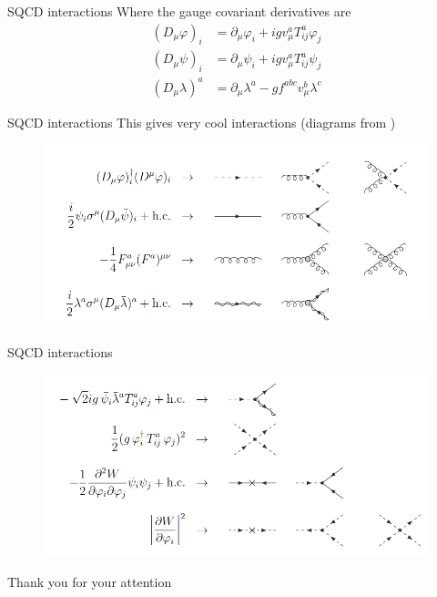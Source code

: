 \documentclass[10pt]{beamer}
\begin{document}
\begin{frame}{SQCD interactions}
    Where the gauge covariant derivatives are
    \begin{equation*}\begin{aligned}
        \left(D_{\mu} \varphi\right)_{i} &=\partial_{\mu} \varphi_{i}+i g v_{\mu}^{a} T_{i j}^{a} \varphi_{j} \\
        \left(D_{\mu} \psi\right)_{i} &=\partial_{\mu} \psi_{i}+i g v_{\mu}^{a} T_{i j}^{a} \psi_{j} \\
        \left(D_{\mu} \lambda\right)^{a} &=\partial_{\mu} \lambda^{a}-g f^{a b c} v_{\mu}^{b} \lambda^{c}
        \end{aligned}
    \end{equation*}
\end{frame}

\begin{frame}{SQCD interactions}
    This gives very cool interactions (diagrams from \cite{Signer_2009})
    \begin{figure}
        \centering 
        \includegraphics[scale=0.35]{sqcd_inter_2.png}
    \end{figure}
\end{frame}

\begin{frame}{SQCD interactions}
    \begin{figure}
        \centering 
        \includegraphics[scale=0.35]{sqcd_inter_1.png}
    \end{figure}
\end{frame}


{
\begin{frame}
    \vfill
    \centerline{Thank you for your attention}
    \vfill
\end{frame}
}

\begin{frame}
    \nocite{*}
    \printbibliography
\end{frame}
\end{document}

